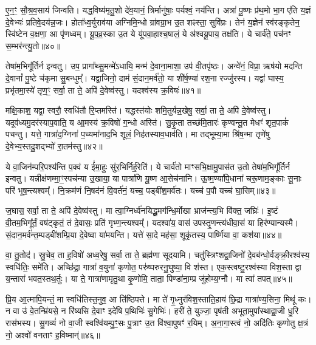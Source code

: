 ए॒न॒ꣳ॒ सौ॒श्र॒व॒साय॑ जिन्वति। यद्ध॒विष्य॑मृतु॒शो दे॑व॒यानं॒ त्रिर्मानु॑षाः॒ पर्यश्वं॒ नय॑न्ति। अत्रा॑ पू॒ष्णः प्र॑थ॒मो भा॒ग ए॑ति य॒ज्ञं दे॒वेभ्यः॑ प्रतिवे॒दय॑न्न॒जः। होता᳚ध्व॒र्युराव॑या अग्निमि॒न्धो ग्रा॑वग्रा॒भ उ॒त शꣴस्ता॒ सुवि॑प्रः। तेन॑ य॒ज्ञेन॑ स्व॑रङ्कृतेन॒ स्वि॑ष्टेन व॒क्षणा॒ आ पृ॑णध्वम्। यू॒प॒व्र॒स्का उ॒त ये यू॑पवा॒हाश्च॒षालं॒ ये अ॑श्वयू॒पाय॒ तक्ष॑ति। ये चार्व॑ते॒ पच॑नꣳ स॒म्भर॑न्त्यु॒तो॥४०॥

तेषा॑म॒भिगू᳚र्तिर्न इन्वतु। उप॒ प्रागा᳚थ्सु॒मन्मे॑\-ऽधायि॒ मन्म॑ दे॒वाना॒माशा॒ उप॑ वी॒तपृ॑ष्ठः। अन्वे॑नं॒ विप्रा॒ ऋष॑यो मदन्ति दे॒वानां᳚ पु॒ष्टे च॑कृमा सु॒बन्धुम्᳚। यद्वा॒जिनो॒ दाम॑ सं॒दान॒मर्व॑तो॒ या शी॑र्\mbox{}ष॒ण्या॑ रश॒ना रज्जु॑रस्य। यद्वा॑ घास्य॒ प्रभृ॑तमा॒स्ये॑ तृण॒ꣳ॒ सर्वा॒ ता ते॒ अपि॑ दे॒वेष्व॑स्तु। यदश्व॑स्य क्र॒विषः॑॥४१॥

मक्षि॒काश॒ यद्वा॒ स्वरौ॒ स्वधि॑तौ रि॒प्तमस्ति॑। यद्धस्त॑योः शमि॒तुर्यन्न॒खेषु॒ सर्वा॒ ता ते॒ अपि॑ दे॒वेष्व॑स्तु। यदूव॑ध्यमु॒दर॑स्याप॒वाति॒ य आ॒मस्य॑ क्र॒विषो॑ ग॒न्धो अस्ति॑। सु॒कृ॒ता तच्छ॑मि॒तारः॑ कृण्वन्तू॒त मेधꣳ॑ शृत॒पाकं॑ पचन्तु। यत्ते॒ गात्रा॑द॒ग्निना॑ प॒च्यमा॑नाद॒भि शूलं॒ निह॑तस्याव॒धाव॑ति। मा तद्भूम्या॒मा श्रि॑ष॒न्मा तृणे॑षु दे॒वेभ्य॒स्तदु॒शद्भ्यो॑ रा॒तम॑स्तु॥४२॥

{\anuvakamend[{इदु॒तो क्र॒विषः॑ श्रिषथ्स॒प्त च॑॥८॥}]}

ये वा॒जिन॑म्परि॒पश्य॑न्ति प॒क्वं य ई॑मा॒हुः सु॑र॒भिर्निर्\mbox{}ह॒रेति॑। ये चार्व॑तो माꣳसभि॒क्षामु॒पास॑त उ॒तो तेषा॑म॒भिगू᳚र्तिर्न इन्वतु। यन्नीक्ष॑णम्मा॒ꣳ॒स्पच॑न्या उ॒खाया॒ या पात्रा॑णि यू॒ष्ण आ॒सेच॑नानि। ऊ॒ष्म॒ण्या॑पि॒धाना॑ चरू॒णाम॒ङ्काः सू॒नाः परि॑ भूष॒न्त्यश्वम्᳚। नि॒क्रम॑णं नि॒षद॑नं वि॒वर्त॑नं॒ यच्च॒ पड्बी॑श॒मर्व॑तः। यच्च॑ प॒पौ यच्च॑ घा॒सिम्॥४३॥

ज॒घास॒ सर्वा॒ ता ते॒ अपि॑ दे॒वेष्व॑स्तु। मा त्वा॒ग्निर्ध्व॑नयिद्धू॒मग॑न्धि॒र्मोखा भ्राज॑न्त्य॒भि वि॑क्त॒ जघ्रिः॑। इ॒ष्टं वी॒तम॒भिगू᳚र्तं॒ वष॑ट्कृतं॒ तं दे॒वासः॒ प्रति॑ गृभ्ण॒न्त्यश्वम्᳚। यदश्वा॑य॒ वास॑ उपस्तृ॒णन्त्य॑धीवा॒सं या हिर॑ण्यान्यस्मै। सं॒दान॒मर्व॑न्त॒म्पड्बी॑शम्प्रि॒या दे॒वेष्वा या॑मयन्ति। यत्ते॑ सा॒दे मह॑सा॒ शूकृ॑तस्य॒ पार्ष्णि॑या वा॒ कश॑या॥४४॥

वा॒ तु॒तोद॑। स्रु॒चेव॒ ता ह॒विषो॑ अध्व॒रेषु॒ सर्वा॒ ता ते॒ ब्रह्म॑णा सूदयामि। चतु॑स्त्रिꣳशद्वा॒जिनो॑ दे॒वब॑न्धो॒र्वङ्क्री॒रश्व॑स्य॒ स्वधि॑तिः॒ समे॑ति। अच्छि॑द्रा॒ गात्रा॑ व॒युना॑ कृणोत॒ परु॑ष्परुरनु॒घुष्या॒ वि श॑स्त। एक॒स्त्वष्टु॒रश्व॑स्या विश॒स्ता द्वा य॒न्तारा॑ भवत॒स्तथ॒र्तुः। या ते॒ गात्रा॑णामृतु॒था कृ॒णोमि॒ ताता॒ पिण्डा॑ना॒म्प्र जु॑होम्य॒ग्नौ। मा त्वा॑ तपत्॥४५॥

प्रि॒य आ॒त्मापि॒यन्तं॒ मा स्वधि॑तिस्त॒नुव॒ आ ति॑ष्ठिपत्ते। मा ते॑ गृ॒ध्नुर॑विश॒स्ताति॒हाय॑ छि॒द्रा गात्रा॑ण्य॒सिना॒ मिथू॑ कः। न वा उ॑ वे॒तन्म्रि॑यसे॒ न रि॑ष्यसि दे॒वाꣳ इदे॑षि प॒थिभिः॑ सु॒गेभिः॑। हरी॑ ते॒ युञ्जा॒ पृष॑ती अभूता॒मुपा᳚स्थाद्वा॒जी धु॒रि रास॑भस्य। सु॒गव्यं॑ नो वा॒जी स्वश्वि॑यम्पु॒ꣳ॒सः पु॒त्राꣳ उ॒त वि॑श्वा॒पुषꣳ॑ र॒यिम्। अ॒ना॒गा॒स्त्वं नो॒ अदि॑तिः कृणोतु क्ष॒त्रं नो॒ अश्वो॑ वनताꣳ ह॒विष्मान्॑॥४६॥

